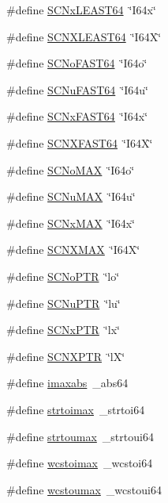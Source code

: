 \begin{DoxyCompactItemize}
\item 
\#define \hyperlink{a00113_ab9af7b2d032897d62a75d76214654612}{S\+C\+Nx\+L\+E\+A\+S\+T64}~\char`\"{}I64x\char`\"{}
\item 
\#define \hyperlink{a00113_ad8a487583ff3859d65390b8e290837d6}{S\+C\+N\+X\+L\+E\+A\+S\+T64}~\char`\"{}I64X\char`\"{}
\item 
\#define \hyperlink{a00113_a1b0fa5948cf2bdfa4c9e17ca046de5a0}{S\+C\+No\+F\+A\+S\+T64}~\char`\"{}I64o\char`\"{}
\item 
\#define \hyperlink{a00113_a4c88287eaf08ffa705c32f41eb174f77}{S\+C\+Nu\+F\+A\+S\+T64}~\char`\"{}I64u\char`\"{}
\item 
\#define \hyperlink{a00113_a020c0b541836e741e0c88bc36fcf25f1}{S\+C\+Nx\+F\+A\+S\+T64}~\char`\"{}I64x\char`\"{}
\item 
\#define \hyperlink{a00113_a338058775569b00a80a67080aee77934}{S\+C\+N\+X\+F\+A\+S\+T64}~\char`\"{}I64X\char`\"{}
\item 
\#define \hyperlink{a00113_a73bc0bffd329a5dac0f2433171aa432d}{S\+C\+No\+M\+AX}~\char`\"{}I64o\char`\"{}
\item 
\#define \hyperlink{a00113_aef1bb910dd38372698c9b94919db652a}{S\+C\+Nu\+M\+AX}~\char`\"{}I64u\char`\"{}
\item 
\#define \hyperlink{a00113_acdb85fa86d6d76bc7a2e16ec0cc3ae58}{S\+C\+Nx\+M\+AX}~\char`\"{}I64x\char`\"{}
\item 
\#define \hyperlink{a00113_a852234513afd0c84134f209fb5d38719}{S\+C\+N\+X\+M\+AX}~\char`\"{}I64X\char`\"{}
\item 
\#define \hyperlink{a00113_a4a30d36e06018d8e13046079098905a0}{S\+C\+No\+P\+TR}~\char`\"{}lo\char`\"{}
\item 
\#define \hyperlink{a00113_ab7dbf5d0ea41679dface5855896e4273}{S\+C\+Nu\+P\+TR}~\char`\"{}lu\char`\"{}
\item 
\#define \hyperlink{a00113_aa58d290d968643862aec7a8a56e1c8e9}{S\+C\+Nx\+P\+TR}~\char`\"{}lx\char`\"{}
\item 
\#define \hyperlink{a00113_a5cec732485352192aea52a939ddd1174}{S\+C\+N\+X\+P\+TR}~\char`\"{}lX\char`\"{}
\item 
\#define \hyperlink{a00113_ae79e51adb5d28d1b1119d29ed234334e}{imaxabs}~\+\_\+abs64
\item 
\#define \hyperlink{a00113_a6c62bc37cb56c347fa44835c4a0bf64c}{strtoimax}~\+\_\+strtoi64
\item 
\#define \hyperlink{a00113_a1289c6c6d3d867956e1532e2416b363d}{strtoumax}~\+\_\+strtoui64
\item 
\#define \hyperlink{a00113_ae026595b1dcc98cdb66cb46381225188}{wcstoimax}~\+\_\+wcstoi64
\item 
\#define \hyperlink{a00113_a32fa60d80a8e42a3290fb49c8865a4d0}{wcstoumax}~\+\_\+wcstoui64
\end{DoxyCompactItemize}
